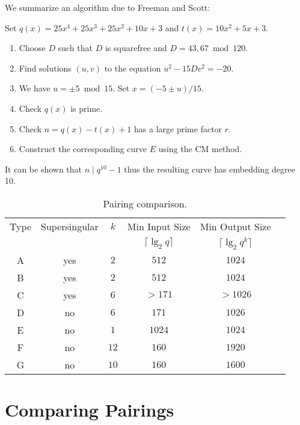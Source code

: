 We summarize an algorithm due to Freeman and Scott:

Set $q(x) = 25x^4 + 25x^3 + 25x^2 + 10x + 3$ and
$t(x) = 10x^2 + 5x + 3$.

\begin{enumerate}
\item
Choose $D$ such that $D$ is squarefree and $D = 43, 67 \bmod 120$.
\item
Find solutions $(u,v)$ to the equation $u^2 - 15 Dv^2 = -20$.
\item
We have $u = \pm 5 \bmod 15$.
Set $x = (-5 \pm u)/15$.
\item
Check $q(x)$ is prime.
\item
Check $n = q(x) - t(x) + 1$ has a large prime factor $r$.
\item
Construct the corresponding curve $E$ using the CM method.
\end{enumerate}

It can be shown that $n \mid q^{10} - 1$ thus the resulting curve has
embedding degree 10.

\begin{table}
\begin{center}
\begin{tabular}{|c|c|c|c|c|c|}

  \hline
  Type & Supersingular & $k$ & Min Input Size & Min Output Size \\
        &     & & $\lceil \lg_2 q \rceil$ & $\lceil \lg_2 {q^k} \rceil$ \\

  \hline
  A & yes & $2$ & $512$ & $1024$ \\
  \hline
  B & yes & $2$ & $512$ & $1024$ \\
  \hline
  C & yes & $6$ & $>171$ & $>1026$ \\
  \hline
  D & no & $6$ & $171$ & $1026$ \\
  \hline
  E & no & $1$ & $1024$ & $1024$ \\
  \hline
  F & no & $12$ & $160$ & $1920$ \\
  \hline
  G & no & $10$ & $160$ & $1600$ \\
  \hline
\end{tabular}
\end{center}
\caption{  \label{tbl:comparepairings}
    Pairing comparison.
}
\end{table}

\section {Comparing Pairings}

